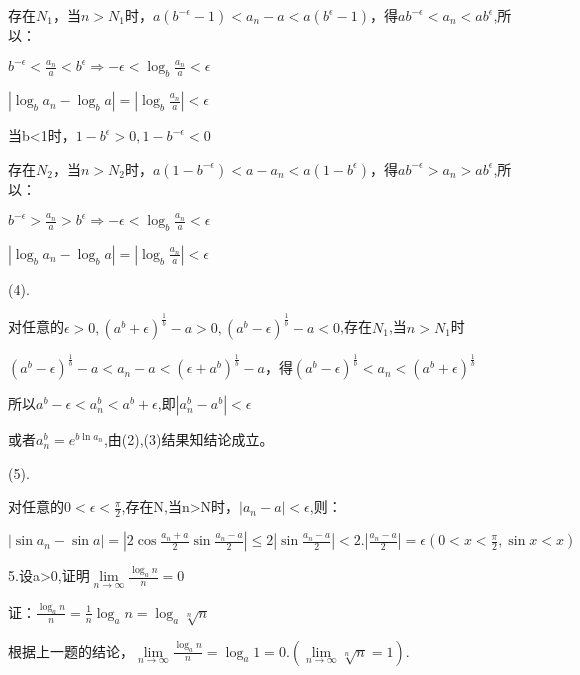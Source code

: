\documentclass[12pt]{ctexart}
\begin{document}
存在$N_1$，当$n>N_1$时，$a(b^{-\epsilon}-1)<a_n-a<a(b^{\epsilon}-1)$，得$ab^{-\epsilon}<a_n<ab^{\epsilon}$,所以：

$b^{-\epsilon}<\frac{a_n}{a}<b^\epsilon\Rightarrow-\epsilon<\log_b{\frac{a_n}{a}}<\epsilon$

$|\log_b{a_n}-\log_b{a}|=|\log_b{\frac{a_n}{a}}|<\epsilon$

当b<1时，$1-b^{\epsilon}>0,1-b^{-\epsilon}<0$

存在$N_2$，当$n>N_2$时，$a(1-b^{-\epsilon})<a-a_n<a(1-b^{\epsilon})$，得$ab^{-\epsilon}>a_n>ab^{\epsilon}$,所以：

$b^{-\epsilon}>\frac{a_n}{a}>b^\epsilon\Rightarrow -\epsilon<\log_b{\frac{a_n}{a}}<\epsilon$

$|\log_b{a_n}-\log_b{a}|=|\log_b{\frac{a_n}{a}}|<\epsilon$

(4).

对任意的$\epsilon>0,(a^b+\epsilon)^{\frac{1}{b}}-a>0,(a^b-\epsilon)^{\frac{1}{b}}-a<0$,存在$N_1$,当$n>N_1$时

$(a^b-\epsilon)^{\frac{1}{b}}-a<a_n-a<(\epsilon+a^b)^{\frac{1}{b}}-a$，得$(a^b-\epsilon)^{\frac{1}{b}}<a_n<(a^b+\epsilon)^{\frac{1}{b}}$

所以$a^b-\epsilon<a_n^b<a^b+\epsilon$,即$|a_n^b-a^b|<\epsilon$

或者$a_n^b=e^{b\ln{a_n}}$,由(2),(3)结果知结论成立。

(5).

对任意的$0<\epsilon<\frac{\pi}{2}$,存在N,当n>N时，$|a_n-a|<\epsilon$,则：

$|\sin{a_n}-\sin{a}|=|2\cos\frac{a_n+a}{2}\sin\frac{a_n-a}{2}|\le2|\sin\frac{a_n-a}{2}|<2.|\frac{a_n-a}{2}|=\epsilon(0<x<\frac{\pi}{2},\sin{x}<x)$


5.设a>0,证明$\lim\limits_{n\to\infty}{\frac{\log_an}{n}}=0$

证：$\frac{\log_a{n}}{n}=\frac{1}{n}\log_a{n}=\log_a{\sqrt[n]{n}}$

根据上一题的结论，$\lim\limits_{n\to\infty}{\frac{\log_an}{n}}=\log_a{1}=0.(\lim\limits_{n\to\infty}\sqrt[n]{n}=1)$.
\end{document}
